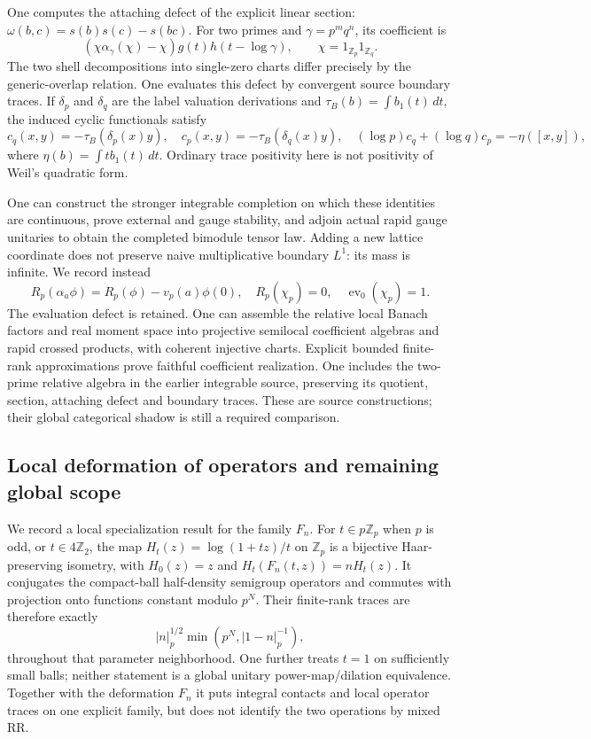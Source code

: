 \documentclass[11pt]{amsart}
\theoremstyle{definition}
\theoremstyle{remark}
\newcommand{\Z}{\mathbb Z}
\begin{document}
One computes the attaching defect of the explicit linear section:
$\omega(b,c)=s(b)s(c)-s(bc)$. For two primes and
$\gamma=p^mq^n$, its coefficient is
\[
 (\chi\alpha_\gamma(\chi)-\chi)g(t)h(t-\log\gamma),
 \qquad \chi=1_{\Z_p}1_{\Z_q}.
\]
The two shell decompositions into single-zero charts differ precisely by
the generic-overlap relation. One evaluates this defect by convergent
source boundary traces. If $\delta_p$ and $\delta_q$ are the label
valuation derivations and $\tau_B(b)=\int b_1(t)\,dt$, the induced cyclic
functionals satisfy
\[
 c_q(x,y)=-\tau_B(\delta_p(x)y),\quad
 c_p(x,y)=-\tau_B(\delta_q(x)y),\quad
 (\log p)c_q+(\log q)c_p=-\eta([x,y]),
\]
where $\eta(b)=\int t b_1(t)\,dt$. Ordinary trace positivity here is
not positivity of Weil's quadratic form.

One can construct the stronger integrable completion on which these
identities are continuous, prove external and gauge stability, and adjoin
actual rapid gauge unitaries to obtain the completed bimodule tensor law.
Adding a new lattice coordinate does not preserve naive multiplicative
boundary $L^1$: its mass is infinite. We record instead
\[
 R_p(\alpha_a\phi)=R_p(\phi)-v_p(a)\phi(0),
 \quad R_p(\chi_p)=0,\quad\operatorname{ev}_0(\chi_p)=1.
\]
The evaluation defect is retained. One can assemble the relative
local Banach factors and real moment space into projective semilocal
coefficient algebras and rapid crossed products, with coherent injective
charts. Explicit bounded finite-rank approximations prove faithful
coefficient realization. One includes the two-prime relative algebra
in the earlier integrable source, preserving its quotient, section,
attaching defect and boundary traces. These are source constructions;
their global categorical shadow is still a required comparison.

\subsection{Local deformation of operators and remaining global scope}
We record a local specialization result for the family $F_n$.
For $t\in p\Z_p$ when $p$ is odd, or $t\in4\Z_2$, the map
$H_t(z)=\log(1+tz)/t$ on $\Z_p$ is a bijective Haar-preserving isometry,
with $H_0(z)=z$ and $H_t(F_n(t,z))=nH_t(z)$.
It conjugates the compact-ball half-density semigroup operators and
commutes with projection onto functions constant modulo $p^N$. Their
finite-rank traces are therefore exactly
\[
 |n|_p^{1/2}\min(p^N,|1-n|_p^{-1}),
\]
throughout that parameter neighborhood. One further treats $t=1$
on sufficiently small balls; neither statement is a global unitary
power-map/dilation equivalence. Together with the deformation $F_n$
it puts integral contacts and local operator traces on one explicit
family, but does not identify the two operations by mixed RR.
\end{document}
